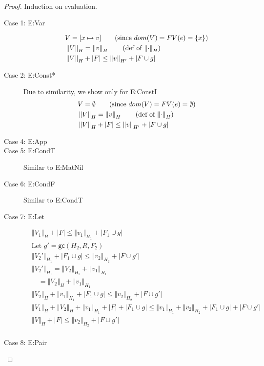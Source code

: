 \documentclass[sigconf]{acmart}
\newcommand{\ssize}[2]{\left\Vert #2 \right\Vert_{#1}}
\newcommand{\gc}[3]{\mathsf{gc}(#1,#2,#3)}
\theoremstyle{definition}
\begin{document}
\begin{proof}
Induction on evaluation.\\
\begin{description}
  \item[Case 1: E:Var]
  \begin{align*}
  &V = [x \mapsto v] \tag{since $dom(V) = FV(e) = \{x\}$}\\
  &\ssize{H}{V} = \ssize{H}{v} \tag{def of $\ssize{H}{\cdot}$}\\
  &\ssize{H}{V} + |F| \le \ssize{H'}{v} + |F \cup g|\\
  \end{align*}
  \item[Case 2: E:Const*]
  Due to similarity, we show only for E:ConstI
  \begin{align*}
  &V = \emptyset \tag{since $dom(V) = FV(e) = \emptyset$}\\
  &\ssize{H}{V} = \ssize{H}{v} \tag{def of $\ssize{H}{\cdot}$}\\
  &\ssize{H}{V} + |F| \le \ssize{H'}{v} + |F \cup g|\\
  \end{align*}
  \item[Case 4: E:App]
  \item[Case 5: E:CondT] Similar to E:MatNil
  \item[Case 6: E:CondF] Similar to E:CondT
  \item [Case 7: E:Let]
  \begin{align*}
  &\ssize{H}{V_1} + |F| \le \ssize{H_1}{v_1} + |F_1 \cup g| \tag{IH on first premise}\\ 
  &\text{Let } g' = \gc{H_2}{R}{F_2}\\
  &\ssize{H_1}{V_2'} + |F_1 \cup g| \le \ssize{H_2}{v_2} + |F \cup g'| \tag{IH on second premise}\\
  &\ssize{H_1}{V_2'} = \ssize{H_1}{V_2} + \ssize{H_1}{v_1} \tag{definition of semantic size}\\
  &\quad = \ssize{H}{V_2} + \ssize{H_1}{v_1} \tag{main lemma}\\
  &\ssize{H}{V_2} + \ssize{H_1}{v_1} + |F_1 \cup g| \le \ssize{H_2}{v_2} + |F \cup g'|\\
  &\ssize{H}{V_1} + \ssize{H}{V_2} + \ssize{H_1}{v_1} + |F| + |F_1 \cup g| \le \ssize{H_1}{v_1} + \ssize{H_2}{v_2} +
  |F_1 \cup g| + |F \cup g'|\\
  &\ssize{H}{V} + |F| \le \ssize{H_2}{v_2} + |F \cup g'|\\
  \end{align*}
  \item[Case 8: E:Pair]

\end{description}
\end{proof}
\end{document}
